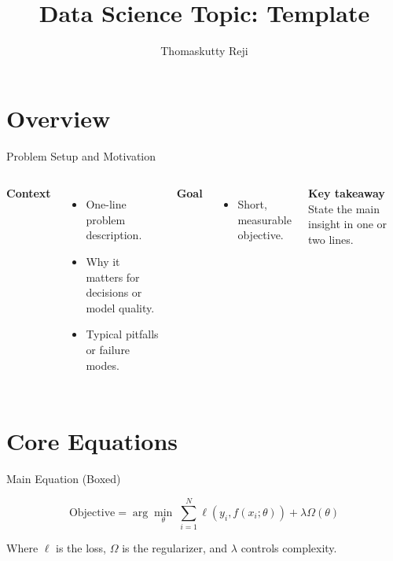 \documentclass[aspectratio=169,10pt]{beamer}
\title[Data Science Slides]{Data Science Topic: Template}
\author[Thomaskutty Reji]{Thomaskutty Reji}
\date{}
\begin{document}
\begin{frame}[t]
\titlepage
\end{frame}


\section{Overview}
\begin{frame}[t]{Problem Setup and Motivation}
\begin{columns}[T,onlytextwidth]
\textbf{Context}
\begin{itemize}
\item One-line problem description.
\item Why it matters for decisions or model quality.
\item Typical pitfalls or failure modes.
\end{itemize}

\textbf{Goal}
\begin{itemize}
\item Short, measurable objective.
\end{itemize}

\begin{highlight}
\textbf{Key takeaway}\newline
State the main insight in one or two lines.
\end{highlight}
\end{columns}
\end{frame}

\section{Core Equations}
\begin{frame}[t]{Main Equation (Boxed)}
\begin{keyeq}
\[
\text{Objective} = \arg\min_{\theta} \; \sum_{i=1}^{N} \ell(y_i, f(x_i;\theta)) + \lambda \Omega(\theta)
\]
\end{keyeq}
\small
Where $\ell$ is the loss, $\Omega$ is the regularizer, and $\lambda$ controls complexity.
\end{frame}
\end{document}
